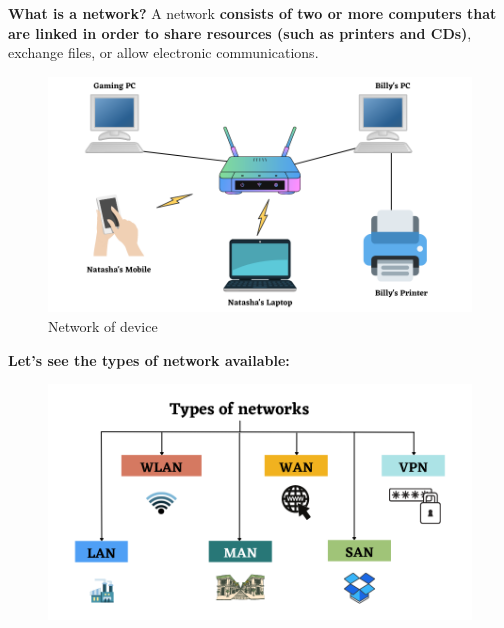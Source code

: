 \setlength{\columnsep}{3pt}
\begin{flushleft}

\bigskip
\textbf{What is a network?}
\newline
A network \textbf{consists of two or more computers that are linked in order to share resources (such as printers and CDs)}, exchange files, or allow electronic communications.

\begin{figure}[h!]
	\centering
	\includegraphics[scale=0.6]{content/chapter14/images/networking.png}
	\caption{Network of device}
	\label{fig:network}
\end{figure}

\newpage

\textbf{Let's see the types of network available:}

\begin{figure}[h!]
	\centering
	\includegraphics[scale=0.6]{content/chapter14/images/network_types.png}
\end{figure}


\end{flushleft}
